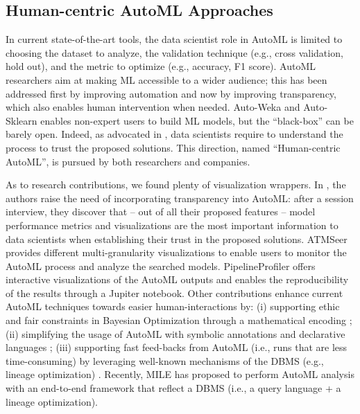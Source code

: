 \subsection{Human-centric AutoML Approaches}
In current state-of-the-art tools, the data scientist role in AutoML is limited to choosing the dataset to analyze, the validation technique (e.g., cross validation, hold out), and the metric to optimize (e.g., accuracy, F1 score).
AutoML researchers aim at making ML accessible to a wider audience;
this has been addressed first by improving automation and now by improving transparency, which also enables human intervention when needed.
Auto-Weka \cite{kotthoff2019auto} and Auto-Sklearn \cite{feurer2019auto} enables non-expert users to build ML models, but the ``black-box'' can be barely open.
Indeed, as advocated in \cite{drozdal2020trust}, data scientists require to understand the process to trust the proposed solutions.
This direction, named ``Human-centric AutoML'', is pursued by both researchers and companies.

As to research contributions, we found plenty of visualization wrappers.
In \cite{drozdal2020trust}, the authors raise the need of incorporating transparency into AutoML: after a session interview, they discover that -- out of all their proposed features -- model performance metrics and visualizations are the most important information to data scientists when establishing their trust in the proposed solutions.
ATMSeer \cite{wang2019atmseer} provides different multi-granularity visualizations to enable users to monitor the AutoML process and analyze the searched models.
PipelineProfiler \cite{ono2020pipelineprofiler} offers interactive visualizations of the AutoML outputs and enables the reproducibility of the results through a Jupiter notebook.
Other contributions enhance current AutoML techniques towards easier human-interactions by: (i) supporting ethic and fair constraints in Bayesian Optimization through a mathematical encoding \cite{perrone2021fair, yaghini2021human}; (ii) simplifying the usage of AutoML with symbolic annotations \cite{peng2020pyglove} and declarative languages \cite{kraska2013mlbase}; (iii) supporting fast feed-backs from AutoML (i.e., runs that are less time-consuming) by leveraging well-known mechanisms of the DBMS (e.g., lineage optimization) \cite{vartak2015supporting, xin2018accelerating}.
Recently, MILE \cite{lee2020human} has proposed to perform AutoML analysis with an end-to-end framework that reflect a DBMS (i.e., a query language + a lineage optimization).

